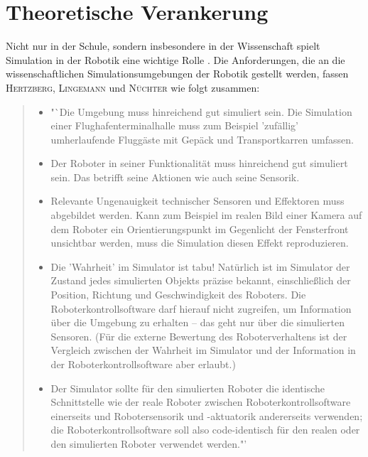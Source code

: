 \documentclass[paper=a4, DIV=calc, BCOR=12mm, twoside=on, onecolumn=on, open = right, titlepage =on, parskip =half-, headsepline = on, footsepline = off, chapterprefix = off, appendixprefix = on, fontsize = 12pt, numbers = noenddot, abstract = on]{scrbook}
\begin{document}
\section{Theoretische Verankerung}
\label{sec:theorie_anforderungen}
Nicht nur in der Schule, sondern insbesondere in der Wissenschaft spielt Simulation in der Robotik eine wichtige Rolle \cite[S.13]{hertzberg:12}. Die Anforderungen, die an die wissenschaftlichen Simulationsumgebungen der Robotik gestellt werden, fassen \textsc{Hertzberg, Lingemann} und \textsc{Nüchter} wie folgt zusammen:
\begin{quote}
\begin{itemize}
\item "`Die Umgebung muss hinreichend gut simuliert sein. Die Simulation einer Flughafenterminalhalle muss zum Beispiel 'zufällig' umherlaufende Fluggäste mit Gepäck und Transportkarren umfassen.

\item Der Roboter in seiner Funktionalität muss hinreichend gut simuliert sein. Das betrifft seine Aktionen wie auch seine Sensorik.

\item Relevante Ungenauigkeit technischer Sensoren und Effektoren muss abgebildet werden. Kann zum Beispiel im realen Bild einer Kamera auf dem Roboter ein Orientierungspunkt im Gegenlicht der Fensterfront unsichtbar werden, muss die Simulation diesen Effekt reproduzieren.

\item Die 'Wahrheit' im Simulator ist tabu! Natürlich ist im Simulator der Zustand jedes simulierten Objekts präzise bekannt, einschließlich der Position, Richtung und Geschwindigkeit des Roboters. Die Roboterkontrollsoftware darf hierauf nicht zugreifen, um Information über die Umgebung zu erhalten -- das geht nur über die simulierten Sensoren. (Für die externe Bewertung des Roboterverhaltens ist der Vergleich zwischen der Wahrheit im Simulator und der Information in der Roboterkontrollsoftware aber erlaubt.)

\item Der Simulator sollte für den simulierten Roboter die identische Schnittstelle wie der reale Roboter zwischen Roboterkontrollsoftware einerseits und Robotersensorik und -ak\-tu\-ato\-rik andererseits verwenden; die Roboterkontrollsoftware soll also code-identisch für den realen oder den simulierten Roboter verwendet werden."' \cite[S.14]{hertzberg:12} 
\end{itemize}
\end{quote}
\end{document}
